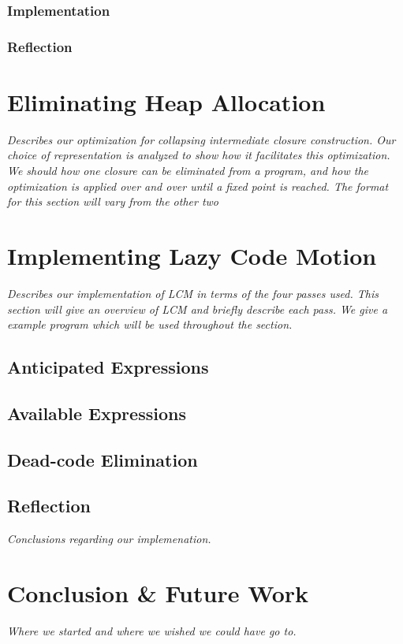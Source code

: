 \documentclass[11pt]{article}
\begin{document}
\subsubsection{Implementation}
\subsubsection{Reflection}

\section{Eliminating Heap Allocation}
\emph{Describes our optimization for collapsing intermediate
closure construction. Our choice of representation is analyzed to
show how it facilitates this optimization. We should how one
closure can be eliminated from a program, and how the optimization
is applied over and over until a fixed point is reached. The format
for this section will vary from the other two}

\section{Implementing Lazy Code Motion}
\emph{Describes our implementation of LCM in terms of the four passes
  used. This section will give an overview of LCM and briefly describe
  each pass. We give a example program which will be used throughout
  the section.}

\subsection{Anticipated Expressions}

\subsection{Available Expressions}

\subsection{Dead-code Elimination}

\subsection{Reflection}

\emph{Conclusions regarding our implemenation.}

\section{Conclusion \& Future Work}

\emph{Where we started and where we wished we could have go to.}
\end{document}
